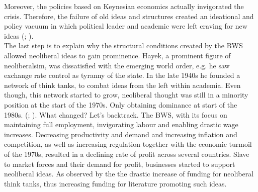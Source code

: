 \documentclass[11pt]{article}
\begin{document}
Moreover, the policies based on Keynesian economics actually invigorated the crisis. Therefore, the failure of old ideas and structures created an ideational and policy vacuum in which political leader and academic were left craving for new ideas    
(\cite[p.~192]{OlsonMancur1982Trad}; \cite[p.~148-149]{TrevithickJamesAnthony1992Ium}
\cite[p.~215-218]{JonesDanielStedman2014Motu}). \\

The last step is to explain why the structural conditions created by the BWS allowed neoliberal ideas to gain prominence. 
Hayek, a prominent figure of neoliberalsim, was dissatisfied with the emerging world order, e.g. he saw exchange rate control as tyranny of the state.
In the late 1940s he founded a network of think tanks, to combat ideas from the left within academia. Even though, this network started to grow, neoliberal thought was still in a minority position at the start of the 1970s. Only obtaining dominance at start of the 1980s.
(\cite{sally2000hayek}; \cite[p.~77-78/178-179]{JonesDanielStedman2014Motu}).
What changed? Let's backtrack.
The BWS, with its focus on maintaining full employment, invigorating labour and enabling drastic wage increases. 
Decreasing productivity and demand and increasing inflation and competition, as well as increasing regulation together with the economic turmoil of the 1970s, resulted in a declining rate of profit across several countries. 
Slave to market forces and their demand for profit, businesses started to support neoliberal ideas. As observed by the the drastic increase of funding for neoliberal think tanks, thus increasing funding for literature promoting such ideas.
\end{document}
